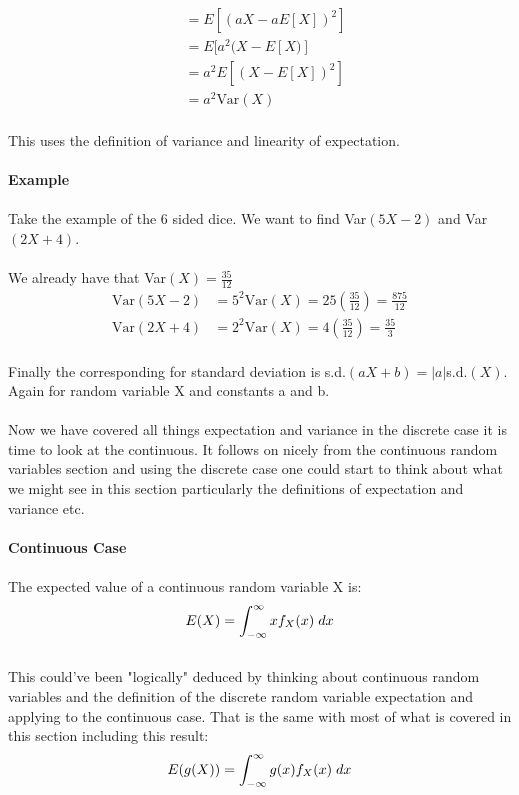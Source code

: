\documentclass[,oneside]{article}
\begin{document}
\begin{enumerate}
\begin{align*}
&= E[(aX-aE[X])^2] \\
&= E[a^2(X-E[X)]\\
&= a^2E[(X-E[X])^2]\\
&= a^2 \text{Var}(X)
\end{align*}\\
This uses the definition of variance and linearity of expectation.\\ \\
\textbf{Example}\\ \\
Take the example of the 6 sided dice. We want to find Var$(5X-2)$ and Var$(2X+4)$.\\ \\
We already have that Var$(X)=\frac{35}{12}$
\begin{align*}
\text{Var}(5X-2)&=5^2\text{Var}(X)=25 \left ( \frac{35}{12} \right )=\frac{875}{12}\\
\text{Var}(2X+4)&=2^2\text{Var}(X)=4 \left ( \frac{35}{12} \right )=\frac{35}{3}
\end{align*}\\
Finally the corresponding for standard deviation is s.d.$(aX+b)=|a|$s.d.$(X)$. Again for random variable X and constants a and b. \\ \\
Now we have covered all things expectation and variance in the discrete case it is time to look at the continuous. It follows on nicely from the continuous random variables section and using the discrete case one could start to think about what we might see in this section particularly the definitions of expectation and variance etc. \\ \\
\textbf{Continuous Case}\\ \\
The expected value of a continuous random variable X is:\\
\begin{align*}
E(X) = \int_{-\infty}^{\infty} xf_X(x)\hspace{0.1cm}dx
\end{align*}\\
This could've been "logically" deduced by thinking about continuous random variables and the definition of the discrete random variable expectation and applying to the continuous case. That is the same with most of what is covered in this section including this result:\\ 
\begin{align*}
E(g(X)) = \int_{-\infty}^{\infty} g(x)f_X(x)\hspace{0.1cm}dx

\end{align*}
\end{enumerate}
\end{document}
